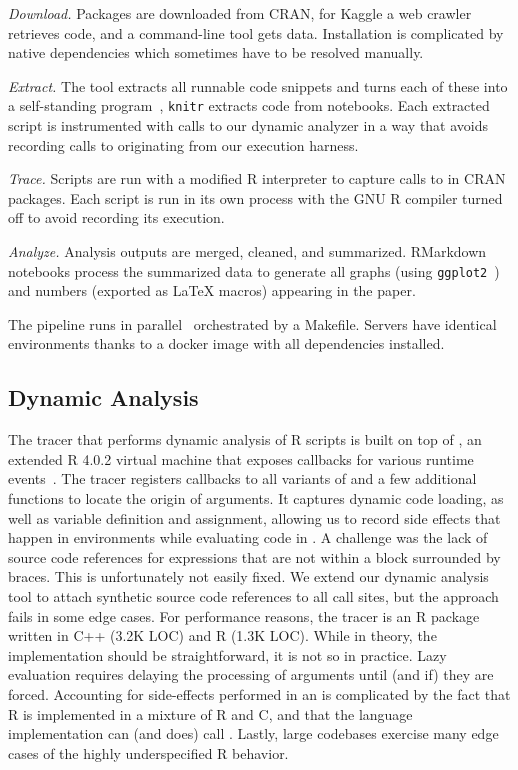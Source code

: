 \documentclass[acmsmall, screen]{acmart}
\renewcommand{\k}[1]{\lstinline |#1|\xspace}
\begin{document}
\begin{compactenum}[(1)]
\item \emph{Download.} Packages are downloaded from CRAN, for Kaggle a web
  crawler retrieves code, and a command-line tool gets data. Installation is
  complicated by native dependencies which sometimes have to be resolved
  manually.
\item \emph{Extract.} The \genthat tool extracts all runnable code snippets and
  turns each of these into a self-standing program~\cite{issta18}, \k{knitr}
  extracts code from notebooks. Each extracted script is instrumented with calls
  to our dynamic analyzer in a way that avoids recording calls to \eval
  originating from our execution harness.
\item \emph{Trace.} Scripts are run with a modified R interpreter to capture
  calls to \eval in CRAN packages. Each script is run in its own process with
  the GNU R compiler turned off to avoid recording its execution.
\item \emph{Analyze.} Analysis outputs are merged, cleaned, and summarized.
  RMarkdown~\cite{rmarkdown} notebooks process the summarized data to generate all graphs (using
  \k{ggplot2}~\cite{ggplot}) and numbers (exported as \LaTeX\xspace macros)
  appearing in the paper.
\end{compactenum}

\medskip The pipeline runs in parallel~\cite{GNUparallel} orchestrated by a
Makefile. Servers have identical environments thanks to a docker image with all
dependencies installed.

\subsection{Dynamic Analysis}

The tracer that performs dynamic analysis of R scripts is built on top of
\rdyntrace, an extended R 4.0.2 virtual machine that exposes callbacks for
various runtime events~\cite{oopsla19b}. The tracer registers callbacks to all
variants of \eval and a few additional functions to locate the origin of \eval
arguments. It captures dynamic code loading, as well as variable definition and
assignment, allowing us to record side effects that happen in environments while
evaluating code in \eval. A challenge was the lack of source code references for
expressions that are not within a block surrounded by braces. This is
unfortunately not easily fixed. We extend our dynamic analysis tool to attach
synthetic source code references to all \eval call sites, but the approach fails
in some edge cases. For performance reasons, the tracer is an R package written
in C++ (3.2K LOC) and R (1.3K LOC). While in theory, the implementation should
be straightforward, it is not so in practice. Lazy evaluation requires delaying
the processing of arguments until (and if) they are forced. Accounting for
side-effects performed in an \eval is complicated by the fact that R is
implemented in a mixture of R and C, and that the language implementation can
(and does) call \eval. Lastly, large codebases exercise many edge cases of the
highly underspecified R behavior.
\end{document}
